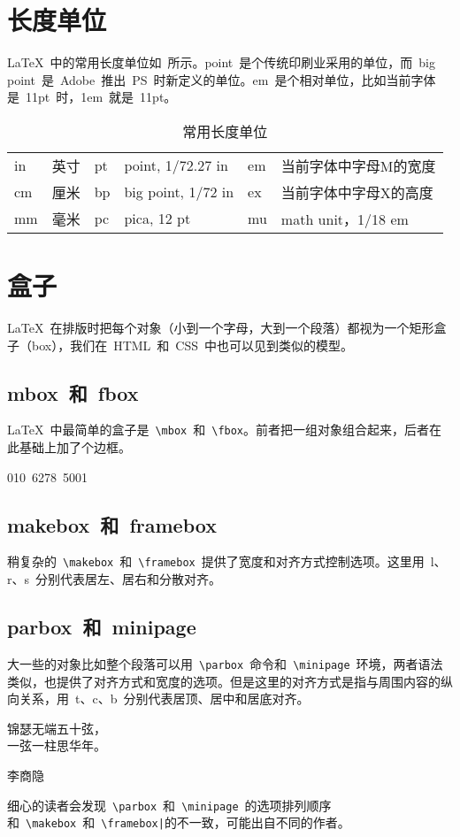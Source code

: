 \section{长度单位}
\LaTeX~中的常用长度单位如~所示。point~是个传统印刷业采用的单位，而~big point~是~Adobe~推出~PS~时新定义的单位。em~是个相对单位，比如当前字体是~11pt~时，1em~就是~11pt。
\begin{table}[htbp]
\caption{常用长度单位}
\label{tab:unit}
\centering
\begin{tabular}{llllll}
    \toprule
    in & 英寸 & pt & point, 1/72.27 in  & em & 当前字体中字母M的宽度 \\
    cm & 厘米 & bp & big point, 1/72 in & ex & 当前字体中字母X的高度 \\
    mm & 毫米 & pc & pica, 12 pt        & mu & math unit，1/18 em \\
    \bottomrule
\end{tabular}
\end{table}

\section{盒子}
\LaTeX~在排版时把每个对象（小到一个字母，大到一个段落）都视为一个矩形盒子（box），我们在~HTML~和~CSS~中也可以见到类似的模型。

\subsection{mbox~和~fbox}

\LaTeX~中最简单的盒子是~\verb|\mbox|~和~\verb|\fbox|。前者把一组对象组合起来，后者在此基础上加了个边框。
\begin{demo}
\mbox{010 6278 5001}
\end{demo}

\subsection{makebox~和~framebox}
稍复杂的~\verb|\makebox|~和~\verb|\framebox|~提供了宽度和对齐方式控制选项。这里用~l、r、s~分别代表居左、居右和分散对齐。
\begin{demo}
\end{demo}

\subsection{parbox~和~minipage}
大一些的对象比如整个段落可以用~\verb|\parbox|~命令和~\verb|\minipage|~环境，两者语法类似，也提供了对齐方式和宽度的选项。但是这里的对齐方式是指与周围内容的纵向关系，用~t、c、b~分别代表居顶、居中和居底对齐。

\begin{demo}
\parbox[c]{90pt}{锦瑟无端五十弦，\\一弦一柱思华年。}李商隐
\end{demo}

细心的读者会发现~\verb|\parbox|~和~\verb|\minipage|~的选项排列顺序和~\verb|\makebox|~和~\verb~\framebox|~的不一致，可能出自不同的作者。



\newpage
